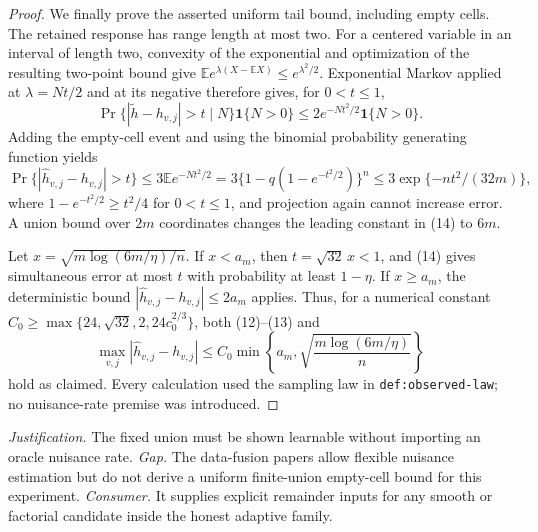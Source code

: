 \documentclass{article}
\begin{document}
\begin{proof}
We finally prove the asserted uniform tail bound, including empty cells.
The retained response has range length at most two.  For a centered variable
in an interval of length two, convexity of the exponential and optimization
of the resulting two-point bound give
\(\mathbb E e^{\lambda(X-\mathbb EX)}\le e^{\lambda^2/2}\).
Exponential Markov applied at \(\lambda=Nt/2\) and at its negative therefore
gives, for \(0<t\le1\),
\[
 \Pr\{|\widetilde h-h_{v,j}|>t\mid N\}\mathbf1\{N>0\}
 \le2e^{-Nt^2/2}\mathbf1\{N>0\}.
\]
Adding the empty-cell event and using the binomial probability generating
function yields
\[
 \Pr\{|\widehat h_{v,j}-h_{v,j}|>t\}
 \le3\mathbb E e^{-Nt^2/2}
 =3\{1-q(1-e^{-t^2/2})\}^n
 \le3\exp\{-nt^2/(32m)\},                                               \tag{14}
\]
where \(1-e^{-t^2/2}\ge t^2/4\) for \(0<t\le1\), and projection again
cannot increase error.  A union bound over \(2m\) coordinates changes the
leading constant in (14) to \(6m\).

Let \(x=\sqrt{m\log(6m/\eta)/n}\).  If \(x<a_m\), then
\(t=\sqrt{32}\,x<1\), and (14) gives simultaneous error at most \(t\)
with probability at least \(1-\eta\).  If \(x\ge a_m\), the deterministic
bound \(|\widehat h_{v,j}-h_{v,j}|\le2a_m\) applies.  Thus, for a numerical
constant \(C_0\ge\max\{24,\sqrt{32},2,24c_0^{2/3}\}\), both (12)--(13) and
\[
 \max_{v,j}|\widehat h_{v,j}-h_{v,j}|
 \le C_0\min\left\{a_m,
       \sqrt{\frac{m\log(6m/\eta)}n}\right\}
\]
hold as claimed.  Every calculation used the sampling law in
\texttt{def:observed-law}; no nuisance-rate premise was introduced.
\end{proof}
\par\smallskip\noindent \textit{Justification.} The fixed union must be shown learnable without importing an oracle nuisance rate. \textit{Gap.} The data-fusion papers allow flexible nuisance estimation but do not derive a uniform finite-union empty-cell bound for this experiment. \textit{Consumer.} It supplies explicit remainder inputs for any smooth or factorial candidate inside the honest adaptive family.
\end{document}
